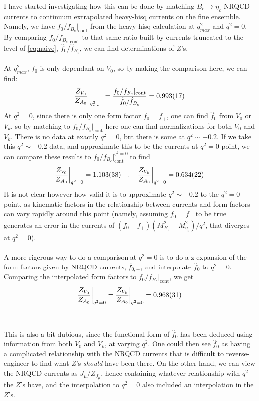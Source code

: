 I have started investigating how this can be done by matching $B_c\to \eta_c$ NRQCD currents to continuum extrapolated heavy-hisq currents on the fine ensemble. Namely, we have $f_0/f_{B_c}|_{\text{cont}}$ from the heavy-hisq calculation at $q^2_{max}$ and $q^2=0$. By comparing $f_0/f_{B_c}|_{\text{cont}}$ to that same ratio built by currents truncated to the level of \eqref{eq:naive}, $\hat{f}_0/\hat{f}_{B_c}$, we can find determinations of $Z$'s.
\\ \\
At $q^2_{max}$, $f_0$ is only dependant on $V_0$, so by making the comparison here, we can find:
\begin{align}
	{Z_{V_0}\over Z_{A_0}}\bigg\rvert_{q^2_{max}} = {f_0/f_{B_c}|_{\text{cont}} \over \hat{f}_0/\hat{f}_{B_c} } = 0.993(17)
\end{align}
At $q^2=0$, since there is only one form factor $f_0=f_+$, one can find $\hat{f}_0$ from $V_0$ or $V_k$, so by matching to $f_0/f_{B_c}|_{\text{cont}}$ here one can find normalizations for both $V_0$ and $V_k$. There is no data at exactly $q^2=0$, but there is some at $q^2\sim -0.2$. If we take this $q^2\sim -0.2$ data, and approximate this to be the currents at $q^2=0$ point, we can compare these results to $f_0/f_{B_c}|^{q^2=0}_{\text{cont}}$ to find
\begin{align}
	{Z_{V_0}\over Z_{A_0}}\bigg\rvert_{q^2=0} = 1.103(38) \quad , \quad {Z_{V_k}\over Z_{A_0}}\bigg\rvert_{q^2=0} = 0.634(22)
\end{align}
It is not clear however how valid it is to approximate $q^2\sim -0.2$ to the $q^2=0$ point, as kinematic factors in the relationship between currents and form factors can vary rapidly around this point (namely, assuming  $f_0=f_+$ to be true generates an error in the currents of $(f_0-f_+)(M_{B_c}^2-M^2_{\eta_c})/q^2$, that diverges at $q^2=0$).
\\ \\
A more rigerous way to do a comparison at $q^2=0$ is to do a z-expansion of the form factors given by NRQCD currents, $\hat{f}_{0,+}$, and interpolate $\hat{f}_0$ to $q^2=0$. Comparing the interpolated form factors to $f_0/f_{B_c}|_{\text{cont}}$, we get
\begin{align}
	{Z_{V_0}\over Z_{A_0}}\bigg\rvert_{q^2=0} = {Z_{V_k}\over Z_{A_0}}\bigg\rvert_{q^2=0} =  0.968(31)
	\label{eq:interpolatedresult}
\end{align}
\\ \\
This is also a bit dubious, since the functional form of $\hat{f}_0$ has been deduced using information from both $V_0$ and $V_k$, at varying $q^2$. One could then see $\hat{f}_0$ as having a complicated relationship with the NRQCD currents that is difficult to reverse-engineer to find what $Z$'s {\it{should}} have been there. On the other hand, we can view the NRQCD currents as $J_{\mu}/Z_{J_{\mu}}$, hence containing whatever relationship with $q^2$ the $Z$'s have, and the interpolation to $q^2=0$ also included an interpolation in the $Z$'s.


